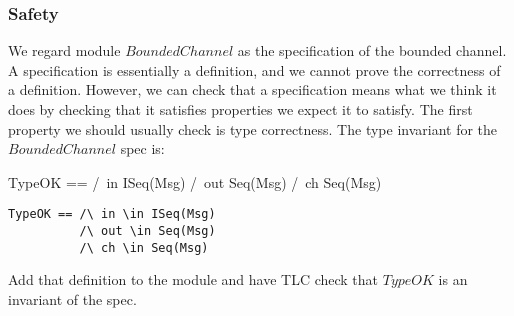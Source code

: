 \documentclass[fleqn,leqno]{article}
\begin{document}
\subsubsection{Safety}

We regard module $BoundedChannel$ as the specification of the bounded
channel.  A specification is essentially a definition, and we cannot
prove the correctness of a definition.  However, we can check that a
specification means what we think it does by checking that it
satisfies properties we expect it to satisfy.  The first property
we should  usually check is type correctness.  The type invariant 
for the $BoundedChannel$ spec is:
\begin{twocols}
\begin{notla}
TypeOK == /\ in \in ISeq(Msg)
          /\ out \in Seq(Msg)
          /\ ch \in Seq(Msg)
\end{notla}
\begin{tlatex}
%
%
%
\end{tlatex}
\midcol
\begin{verbatim}
TypeOK == /\ in \in ISeq(Msg)
          /\ out \in Seq(Msg)
          /\ ch \in Seq(Msg)
\end{verbatim}
\end{twocols}
Add that definition to the module and have TLC check that $TypeOK$
is an invariant of the spec.
\end{document}
